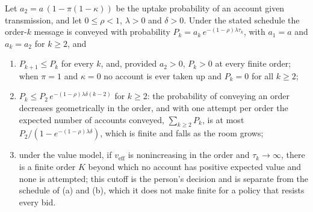 \begin{proposition}\label{prop:tower}
Let $a_2 = a\,(1 - \pi(1-\kappa))$ be the uptake probability of an account given transmission, and let $0 \le \rho < 1$, $\lambda > 0$ and $\delta > 0$. Under the stated schedule the order-$k$ message is conveyed with probability $P_k = a_k\,e^{-(1-\rho)\lambda\tau_k}$, with $a_1 = a$ and $a_k = a_2$ for $k \ge 2$, and
\begin{enumerate}[label=(\alph*)]
\item $P_{k+1} \le P_k$ for every $k$, and, provided $a_2 > 0$, $P_k > 0$ at every finite order; when $\pi = 1$ and $\kappa = 0$ no account is ever taken up and $P_k = 0$ for all $k \ge 2$;
\item $P_k \le P_2\, e^{-(1-\rho)\lambda\delta(k-2)}$ for $k \ge 2$: the probability of conveying an order decreases geometrically in the order, and with one attempt per order the expected number of accounts conveyed, $\sum_{k \ge 2} P_k$, is at most $P_2/(1 - e^{-(1-\rho)\lambda\delta})$, which is finite and falls as the room grows;
\item under the value model, if $v_{\mathrm{eff}}$ is nonincreasing in the order and $\tau_k \to \infty$, there is a finite order $K$ beyond which no account has positive expected value and none is attempted; this cutoff is the person's decision and is separate from the schedule of (a) and (b), which it does not make finite for a policy that resists every bid.
\end{enumerate}
\end{proposition}

